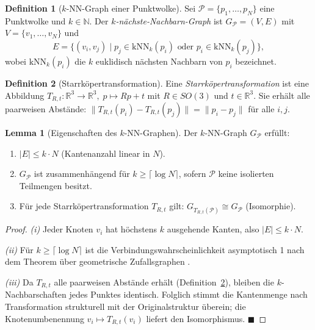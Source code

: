 ﻿\documentclass[a4paper,12pt]{article}
\theoremstyle{definition}
\newtheorem{definition}{Definition}[section]
\newtheorem{lemma}{Lemma}[section]
\begin{document}
\begin{definition}[$k$-NN-Graph einer Punktwolke]
  \label{def:knn_graph}
  Sei $\mathcal{P} = \{p_1, \ldots, p_N\}$ eine Punktwolke und
  $k \in \mathbb{N}$. Der \emph{$k$-nächste-Nachbarn-Graph} ist
  $G_\mathcal{P} = (V, E)$ mit $V = \{v_1, \ldots, v_N\}$ und
  \[
    E = \bigl\{(v_i, v_j) \;\big|\;
        p_j \in \mathrm{kNN}_k(p_i) \text{ oder }
        p_i \in \mathrm{kNN}_k(p_j)\bigr\},
  \]
  wobei $\mathrm{kNN}_k(p_i)$ die $k$ euklidisch nächsten Nachbarn
  von $p_i$ bezeichnet.
\end{definition}

\begin{definition}[Starrköpertransformation]
  \label{def:starr}
  Eine \emph{Starrköpertransformation} ist eine Abbildung
  $T_{R,t}: \mathbb{R}^3 \to \mathbb{R}^3,\; p \mapsto Rp + t$
  mit $R \in SO(3)$ und $t \in \mathbb{R}^3$.
  Sie erhält alle paarweisen Abstände:
  $\|T_{R,t}(p_i) - T_{R,t}(p_j)\| = \|p_i - p_j\|$ für alle $i,j$.
\end{definition}

\begin{lemma}[Eigenschaften des $k$-NN-Graphen]
  \label{lem:knn_properties}
  Der $k$-NN-Graph $G_\mathcal{P}$ erfüllt:
  \begin{enumerate}
    \item $|E| \leq k \cdot N$ (Kantenanzahl linear in $N$).
    \item $G_\mathcal{P}$ ist zusammenhängend für $k \geq
          \lceil \log N \rceil$, sofern $\mathcal{P}$ keine
          isolierten Teilmengen besitzt.
    \item Für jede Starrköpertransformation $T_{R,t}$ gilt:
          $G_{T_{R,t}(\mathcal{P})} \cong G_\mathcal{P}$
          (Isomorphie).
  \end{enumerate}
\end{lemma}

\begin{proof}
  \emph{(i)} Jeder Knoten $v_i$ hat höchstens $k$ ausgehende Kanten,
  also $|E| \leq k \cdot N$.

  \emph{(ii)} Für $k \geq \lceil \log N \rceil$ ist die
  Verbindungswahrscheinlichkeit asymptotisch 1 nach dem Theorem
  über geometrische Zufallsgraphen \citep{Penrose2003}.

  \emph{(iii)} Da $T_{R,t}$ alle paarweisen Abstände erhält
  (Definition~\ref{def:starr}), bleiben die $k$-Nachbarschaften
  jedes Punktes identisch. Folglich stimmt die Kantenmenge nach
  Transformation strukturell mit der Originalstruktur überein;
  die Knotenumbenennung $v_i \mapsto T_{R,t}(v_i)$ liefert
  den Isomorphismus. \hfill$\blacksquare$
\end{proof}
\end{document}
